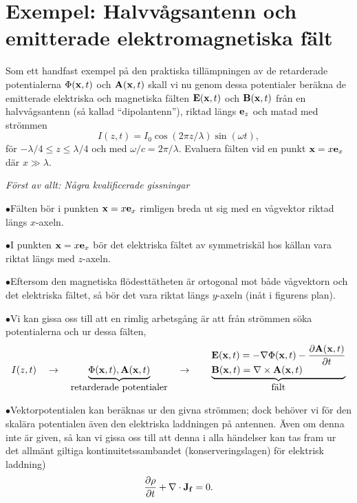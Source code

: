 \section{Exempel: Halvv{\aa}gsantenn och emitterade elektromagnetiska f{\"a}lt}
Som ett handfast exempel p{\aa} den praktiska till{\"a}mpningen av de
retarderade potentialerna $\Phi({\bf x},t)$ och ${\bf A}({\bf x},t)$ skall vi
nu genom dessa potentialer ber{\"a}kna de emitterade elektriska och magnetiska
f{\"a}lten ${\bf E}({\bf x},t)$ och ${\bf B}({\bf x},t)$ fr{\aa}n en
halvv{\aa}gsantenn (s{\aa} kallad ``dipolantenn''), riktad l{\"a}ngs
${\bf e}_z$ och matad med str{\"o}mmen
$$
  I(z,t) = I_0\cos(2\pi z/\lambda)\sin(\omega t),
$$
f{\"o}r $-\lambda/4\le z\le \lambda/4$ och med $\omega/c=2\pi/\lambda$.
Evaluera f{\"a}lten vid en punkt ${\bf x}=x{\bf e}_x$ d{\"a}r $x\gg\lambda$.
\smallskip\centerline{}
\medskip
\noindent
{\it F{\"o}rst av allt: N{\aa}gra kvalificerade gissningar}
\smallskip
\noindent
\item{$\bullet$}{F{\"a}lten b{\"o}r i punkten ${\bf x}=x{\bf e}_x$ rimligen
    breda ut sig med en v{\aa}gvektor riktad l{\"a}ngs $x$-axeln.}
\item{$\bullet$}{I punkten ${\bf x}=x{\bf e}_x$ b{\"o}r det elektriska
    f{\"a}ltet av symmetrisk{\"a}l hos k{\"a}llan vara riktat l{\"a}ngs
    med $z$-axeln.}
\item{$\bullet$}{Eftersom den magnetiska fl{\"o}destt{\"a}theten {\"a}r
    ortogonal mot b{\aa}de v{\aa}gvektorn och det elektriska f{\"a}ltet,
    s{\aa} b{\"o}r det vara riktat l{\"a}ngs $y$-axeln (in{\aa}t i figurens
    plan).}
\item{$\bullet$}{Vi kan gissa oss till att en rimlig arbetsg{\aa}ng {\"a}r
    att fr{\aa}n str{\"o}mmen s{\"o}ka potentialerna och ur dessa f{\"a}lten,
    $$
      I(z,t)\quad\to\quad
      \underbrace{\Phi({\bf x},t),{\bf A}({\bf x},t)}_{\hbox{retarderade
          potentialer}}
      \quad\to\qquad
      \underbrace{
        \vbox{
          \hbox{$\displaystyle
	    {\bf E}({\bf x},t)=-\nabla\Phi({\bf x},t)
	        -{{\partial{\bf A}({\bf x},t)}\over{\partial t}}$}
          \hbox{$\displaystyle
	    {\bf B}({\bf x},t)=\nabla\times{\bf A}({\bf x},t)$}
	}
      }_{\hbox{f{\"a}lt}}
    $$}
\item{$\bullet$}{Vektorpotentialen kan ber{\"a}knas ur den givna str{\"o}mmen;
    dock beh{\"o}ver vi f{\"o}r den skal{\"a}ra potentialen {\"a}ven den
    elektriska laddningen p{\aa} antennen. {\"A}ven om denna inte {\"a}r
    given, s{\aa} kan vi gissa oss till att denna i alla h{\"a}ndelser kan
    tas fram ur det allm{\"a}nt giltiga kontinuitetssambandet
    (konserveringslagen) f{\"o}r elektrisk laddning)
    $$
      {{\partial\rho}\over{\partial t}}+\nabla\cdot{\bf J}_{\bf f}=0.
    $$}
